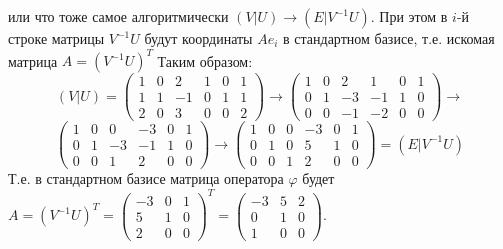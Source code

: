 \documentclass{article}
\begin{document}
или что тоже самое алгоритмически $(V|U)\rightarrow(E|V^{-1}U)$. При этом в $i$-й строке матрицы $V^{-1}U$ будут координаты $Ae_i$ в стандартном базисе, т.е. искомая матрица $A = (V^{-1}U)^T$  Таким образом:
$$(V|U)=\left(\begin{array}{rrr|rrr}1 & 0 & 2 & 1 & 0 & 1\\1 & 1 & -1 & 0 & 1 & 1\\2 & 0 & 3 & 0 & 0 & 2\end{array}\right)\rightarrow\left(\begin{array}{rrr|rrr}1 & 0 & 2 & 1 & 0 & 1\\0 & 1 & -3 & -1 & 1 & 0\\0 & 0 & -1 & -2 & 0 & 0\end{array}\right)\rightarrow$$
$$\left(\begin{array}{rrr|rrr}1 & 0 & 0 & -3 & 0 & 1\\0 & 1 & -3 & -1 & 1 & 0\\0 & 0 & 1 & 2 & 0 & 0\end{array}\right)\rightarrow\left(\begin{array}{rrr|rrr}1 & 0 & 0 & -3 & 0 & 1\\0 & 1 & 0 & 5 & 1 & 0\\0 & 0 & 1 & 2 & 0 & 0\end{array}\right)=(E|V^{-1}U)$$
Т.е. в стандартном базисе матрица оператора $\varphi$ будет $A=(V^{-1}U)^T=\left(\begin{array}{rrr}-3 & 0 & 1\\5 & 1 & 0\\2 & 0 & 0\end{array}\right)^T=\left(\begin{array}{rrr}-3 & 5 & 2\\0 & 1 & 0\\1 & 0 & 0\end{array}\right)$.
\end{document}
